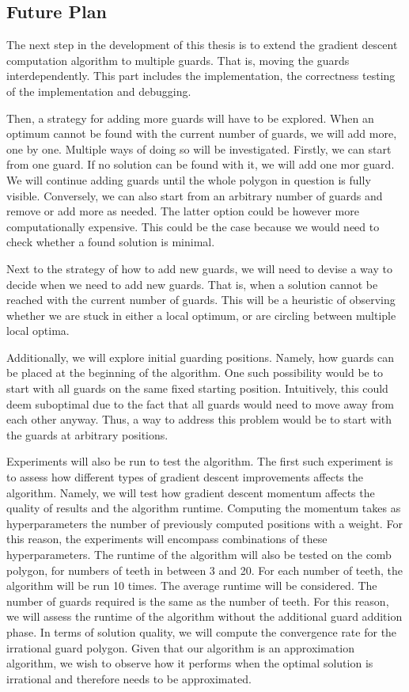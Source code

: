 \subsection{Future Plan}
The next step in the development of this thesis is to extend the gradient descent computation algorithm to multiple guards. That is, moving the guards interdependently. This part includes the implementation, the correctness testing of the implementation and debugging. 

Then, a strategy for adding more guards will have to be explored. When an optimum cannot be found with the current number of guards, we will add more, one by one. Multiple ways of doing so will be investigated. Firstly, we can start from one guard. If no solution can be found with it, we will add one mor guard. We will continue adding guards until the whole polygon in question is fully visible. Conversely, we can also start from an arbitrary number of guards and remove or add more as needed. The latter option could be however more computationally expensive. This could be the case because we would need to check whether a found solution is minimal.

Next to the strategy of how to add new guards, we will need to devise a way to decide when we need to add new guards. That is, when a solution cannot be reached with the current number of guards. This will be a heuristic of observing whether we are stuck in either a local optimum, or are circling between multiple local optima.

Additionally, we will explore initial guarding positions. Namely, how guards can be placed at the beginning of the algorithm. One such possibility would be to start with all guards on the same fixed starting position. Intuitively, this could deem suboptimal due to the fact that all guards would need to move away from each other anyway. Thus, a way to address this problem would be to start with the guards at arbitrary positions.

Experiments will also be run to test the algorithm. 
The first such experiment is to assess how different types of gradient descent improvements affects the algorithm. Namely, we will test how gradient descent momentum \cite{goodfelow2016deep} affects the quality of results and the algorithm runtime. Computing the momentum takes as hyperparameters the number of previously computed positions with a weight. For this reason, the experiments will encompass combinations of these hyperparameters.
The runtime of the algorithm will also be tested on the comb polygon, for  numbers of teeth in between 3 and 20. For each number of teeth, the algorithm will be run 10 times. The average runtime will be considered. The number of guards required is the same as the number of teeth. For this reason, we will assess the runtime of the algorithm without the additional guard addition phase. 
In terms of solution quality, we will compute the convergence rate for the irrational guard polygon. Given that our algorithm is an approximation algorithm, we wish to observe how it performs when the optimal solution is irrational and therefore needs to be approximated.

